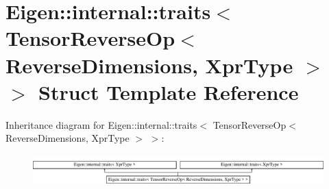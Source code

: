 \hypertarget{struct_eigen_1_1internal_1_1traits_3_01_tensor_reverse_op_3_01_reverse_dimensions_00_01_xpr_type_01_4_01_4}{}\section{Eigen\+:\+:internal\+:\+:traits$<$ Tensor\+Reverse\+Op$<$ Reverse\+Dimensions, Xpr\+Type $>$ $>$ Struct Template Reference}
\label{struct_eigen_1_1internal_1_1traits_3_01_tensor_reverse_op_3_01_reverse_dimensions_00_01_xpr_type_01_4_01_4}
Inheritance diagram for Eigen\+:\+:internal\+:\+:traits$<$ Tensor\+Reverse\+Op$<$ Reverse\+Dimensions, Xpr\+Type $>$ $>$\+:\begin{figure}[H]
\begin{center}
\leavevmode
\includegraphics[height=1.236203cm]{struct_eigen_1_1internal_1_1traits_3_01_tensor_reverse_op_3_01_reverse_dimensions_00_01_xpr_type_01_4_01_4}
\end{center}
\end{figure}
